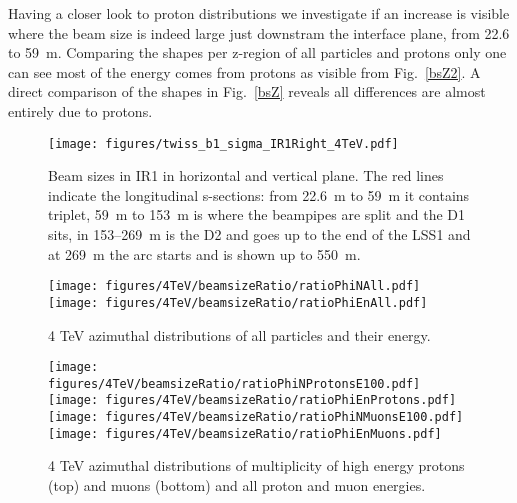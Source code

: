 Having a closer look to proton distributions we investigate if an increase is visible where the beam size is indeed large just downstram the interface plane, from 22.6 to 59~m. Comparing the shapes per z-region of all particles and protons only one can see most of the energy comes from protons as visible from Fig.~\ref{bsZ2}. A direct comparison of the shapes in Fig.~\ref{bsZ} reveals all differences are almost entirely due to protons.

\begin{figure}%
\begin{center}
  \texttt{[image: figures/twiss\_b1\_sigma\_IR1Right\_4TeV.pdf]}
\end{center}
\vspace{-0.6cm}
 \caption{Beam sizes in IR1 in horizontal and vertical plane. The red lines indicate the longitudinal s-sections: from 22.6~m to 59~m it contains triplet, 59~m to 153~m is where the beampipes are split and the D1 sits, in 153--269~m is the D2 and goes up to the end of the LSS1 and at 269~m the arc starts and is shown up to 550~m.
  \label{twissfileBS}}
\end{figure}


\begin{figure}%
\begin{center}
  \texttt{[image: figures/4TeV/beamsizeRatio/ratioPhiNAll.pdf]}
  \texttt{[image: figures/4TeV/beamsizeRatio/ratioPhiEnAll.pdf]}
\end{center}
\vspace{-0.6cm}
 \caption{4 TeV azimuthal distributions of all particles and their energy.
  \label{bsRatioPhiAll}}
\end{figure}

\begin{figure}%
\begin{center}
  \texttt{[image: figures/4TeV/beamsizeRatio/ratioPhiNProtonsE100.pdf]}
  \texttt{[image: figures/4TeV/beamsizeRatio/ratioPhiEnProtons.pdf]}
  \texttt{[image: figures/4TeV/beamsizeRatio/ratioPhiNMuonsE100.pdf]}
  \texttt{[image: figures/4TeV/beamsizeRatio/ratioPhiEnMuons.pdf]}
\end{center}
\vspace{-0.6cm}
 \caption{4 TeV azimuthal distributions of multiplicity of high energy protons (top) and muons (bottom) and all proton and muon energies.
  \label{bsRatioPhiMP}}
\end{figure}


